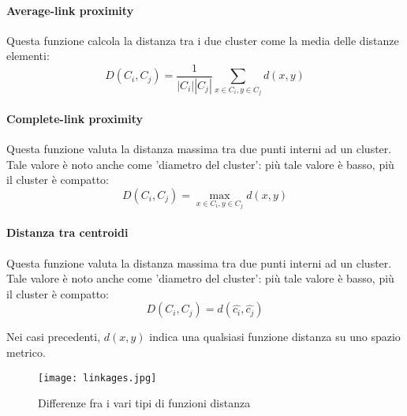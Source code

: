\paragraph{Average-link proximity}
Questa funzione calcola la distanza tra i due cluster come la media delle distanze elementi:
\begin{equation}
  D\left ( C_i, C_j \right ) = \frac{1}{|C_i||C_j|}\sum_{x \in C_i, y \in C_j} d\left ( x, y \right )
\end{equation}

\paragraph{Complete-link proximity}
Questa funzione valuta la distanza massima tra due punti interni ad un cluster. Tale valore è noto anche come 'diametro del cluster': più tale valore è basso, più il cluster è compatto:
\begin{equation}
  D\left ( C_i, C_j \right ) = \max_{x \in C_i, y \in C_j} d\left ( x, y \right )
\end{equation}

\paragraph{Distanza tra centroidi}
Questa funzione valuta la distanza massima tra due punti interni ad un cluster. Tale valore è noto anche come 'diametro del cluster': più tale valore è basso, più il cluster è compatto:
\begin{equation}
  D\left ( C_i, C_j \right ) = d\left ( \hat{c_i}, \hat{c_j} \right )
\end{equation}


Nei casi precedenti, $ d\left ( x, y \right )$ indica una qualsiasi funzione distanza su uno spazio metrico.
\begin{figure}[htb]
	\centering
	\texttt{[image: linkages.jpg]}
	\caption{Differenze fra i vari tipi di funzioni distanza}
	\label{linkages}
\end{figure}

